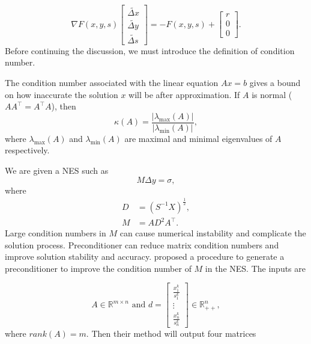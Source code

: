\begin{equation}
    \nabla F(x, y, s)\left[\begin{array}{l}
\widetilde{\Delta x}  \\
\widetilde{\Delta y}  \\
\widetilde{\Delta s} 
\end{array}\right]=-F(x, y, s)+\left[\begin{array}{l}
r \\
0 \\
0
\end{array}\right].
\end{equation}
Before continuing the discussion, we must introduce the definition of condition number.
\begin{definition}
The condition number associated with the linear equation $Ax = b$ gives a bound on how inaccurate the solution $x$ will be after approximation. If $A$ is normal ($AA^{\top}=A^{\top}A$), then
\begin{equation}
    \kappa(A)=\frac{\left|\lambda_{\max }(A)\right|}{\left|\lambda_{\min }(A)\right|},
\end{equation}
where $\lambda_{\max }(A)$ and $\lambda_{\min }(A)$ are maximal and minimal eigenvalues of $A$ respectively.
\end{definition}

We are given a NES such as 
\begin{equation}
    M \Delta y=\sigma,
\end{equation}
where
\begin{equation}
\begin{aligned}
D & = (S^{-1} X)^{\frac{1}{2}},\\
M & = A D^2 A^{\top}.
\end{aligned}
\end{equation}
Large condition numbers in $M$ can cause numerical instability and complicate the solution process. Preconditioner can reduce matrix condition numbers and improve solution stability and accuracy.  \cite{monteiro2004uniform} proposed a procedure to generate a preconditioner to improve the condition number of $M$ in the NES. The inputs are

\begin{equation}
    A \in \mathbb{R}^{m \times n} \text { and } d=\left[\begin{array}{c}
\frac{x_1^k}{s_1^k} \\
\vdots \\
\frac{x_n^k}{s_n^k}
\end{array}\right] \in \mathbb{R}_{++}^n,
\end{equation}
where $rank(A)=m$. Then their method will output four matrices 

